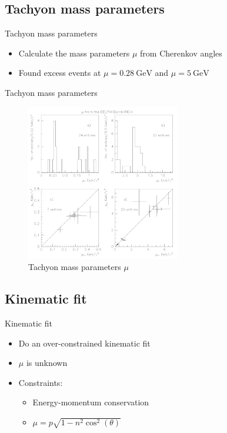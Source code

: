 \documentclass{beamer}
\begin{document}
\subsection{Tachyon mass parameters}
\begin{frame}{Tachyon mass parameters}
  \begin{itemize}
    \item{Calculate the mass parameters $\mu$ from Cherenkov angles}
    \item{Found excess events at $\mu = \SI{0.28}{\giga\eV}$ and $\mu = \SI{5}{\giga\eV}$}
  \end{itemize}
\end{frame}

\begin{frame}{Tachyon mass parameters}
  \begin{figure}
    \centering
    \includegraphics[width = 0.6\textwidth]{MassParameters.png}
    \caption{Tachyon mass parameters $\mu$}
  \end{figure}
\end{frame}

\subsection{Kinematic fit}
\begin{frame}{Kinematic fit}
  \begin{itemize}
    \item{Do an over-constrained kinematic fit}
    \item{$\mu$ is unknown}
    \item{Constraints:}
    \begin{itemize}
      \item{Energy-momentum conservation}
      \item{$\mu = p\sqrt{1 - n^2\cos^2(\theta)}$}
    \end{itemize}
  \end{itemize}
\end{frame}
\end{document}
